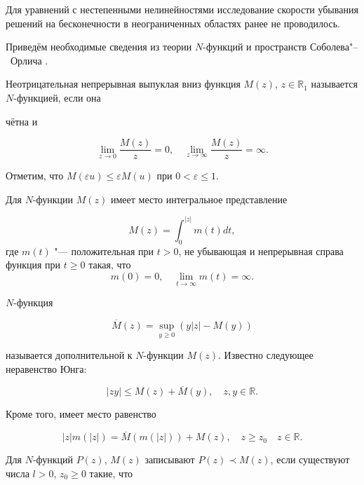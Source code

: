 Для уравнений с нестепенными нелинейностями исследование скорости убывания решений на бесконечности в неограниченных областях ранее не проводилось.



\smallskip




Приведём необходимые сведения из теории $N$-функций и пространств Соболева"--~Орлича \cite{KozhKhad:bib:Rut}.

Неотрицательная непрерывная выпуклая вниз функция $M(z)$, $z\in\mathbb{R}_{1}$ называется $N$-функцией, если она

чётна и

$$\lim\limits_{z \to  0}\frac{M(z)}{z}=0, \quad

\lim\limits_{z \to \infty}\frac{M(z)}{z}=\infty.$$

Отметим, что $M(\varepsilon u)\leq \varepsilon M(u)$ при $0<\varepsilon\leq1$.

Для $N$-функции $M(z)$ имеет место интегральное представление

$$M(z)=\int_{0}^{|z|}m(t)dt,$$ где $m(t)$ "--- положительная при $t>0$, не убывающая  и непрерывная справа функция при $t\geq0$ такая, что $$m(0)=0,\quad \lim\limits_{t \to  \infty}m(t)=\infty.$$



$N$-функция

$$

\overline{M}(z)=\sup_{y\geq 0}(y|z|-M(y))

$$

называется дополнительной к $N$-функции $M(z)$. Известно следующее неравенство Юнга:

\begin{equation}\label{eq:Kozh:ung}

|zy|\leq M(z)+\overline{M}(y),\quad z,y\in \mathbb{R}.

\end{equation}

Кроме того, имеет место равенство

\begin{equation}\label{eq:Kozh:ung-r}

|z|m(|z|)=\overline{M}(m(|z|))+M(z),\quad  z\geq z_0 \quad  z\in \mathbb{R}.

\end{equation}



Для $N$-функций $P(z)$, $M(z)$ записывают $P(z)\prec M(z)$, если существуют числа $l>0$, $z_0\geq 0$ такие, что

